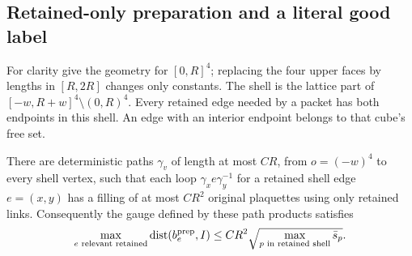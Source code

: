 \subsection{Retained-only preparation and a literal good label}

For clarity give the geometry for \([0,R]^4\); replacing the four upper faces by lengths in \([R,2R]\) changes only constants. The shell is the lattice part of \([-w,R+w]^4\setminus(0,R)^4\). Every retained edge needed by a packet has both endpoints in this shell. An edge with an interior endpoint belongs to that cube's free set.

\begin{lemma}
\label{cb:collar}
There are deterministic paths \(\gamma_v\) of length at most \(CR\), from \(o=(-w)^4\) to every shell vertex, such that each loop \(\gamma_xe\gamma_y^{-1}\) for a retained shell edge \(e=(x,y)\) has a filling of at most \(CR^2\) original plaquettes using only retained links. Consequently the gauge defined by these path products satisfies
\begin{equation}
 \max_{e\text{ relevant retained}}\operatorname{dist}(b_e^{\rm prep},I)
 \le CR^2\sqrt{\max_{p\text{ in retained shell}}\bar s_p}.
 \label{cb:collargauge}
\end{equation}
\end{lemma}
